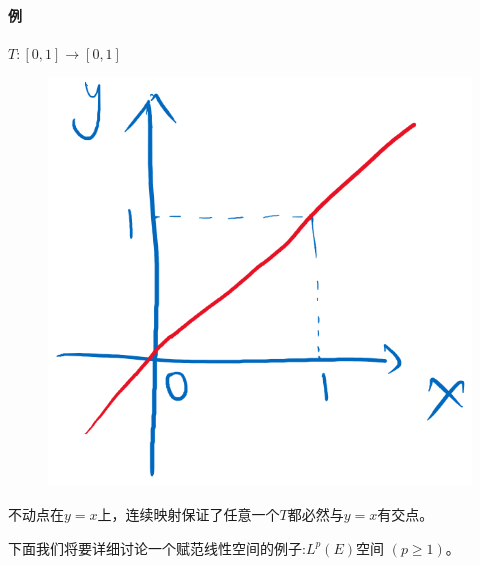 \paragraph*{例} \quad $T:[0,1] \to [0,1]$
\begin{figure}[htbp]
    \center
    \includegraphics[scale=0.2]{./fig/3.1.2-1.png}
\end{figure}
不动点在$y=x$上，连续映射保证了任意一个$T$都必然与$y=x$有交点。

下面我们将要详细讨论一个赋范线性空间的例子:$L^p(E)$空间 $(p \geq 1)$。

